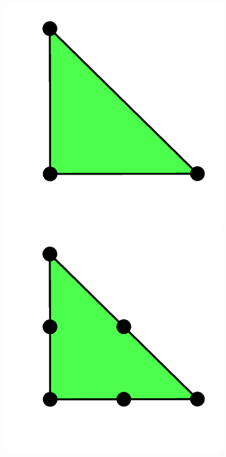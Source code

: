 \begin{figure}
  {\includegraphics[width=\threefigsfull]{chapters/kirby-6/png/CG1_2d.png}
   \includegraphics[width=\threefigsfull]{chapters/kirby-6/png/CG2_2d.png}
}
\end{figure}
